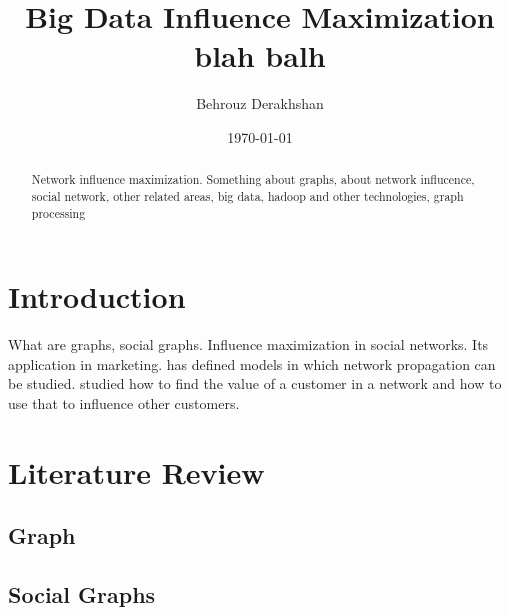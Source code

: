 \documentclass[english]{tktltiki}
\begin{document}
\onehalfspacing

\title{Big Data Influence Maximization blah balh}
\author{Behrouz Derakhshan}
\date{\today}

\maketitle



\begin{abstract}

Network influence maximization. Something about graphs, about network influcence, social network, other related areas, big data, hadoop and other technologies, graph processing

\end{abstract}

\mytableofcontents




\section{Introduction}
What are graphs, social graphs. Influence maximization in social networks. Its application in marketing.  \cite{kempe03} has defined models in which network propagation can be studied. 
\cite{domingo01} studied how to find the value of a customer in a network and how to use that to influence other customers.




\section{Literature Review}



\subsection{Graph}




\subsection{Social Graphs}
\end{document}
